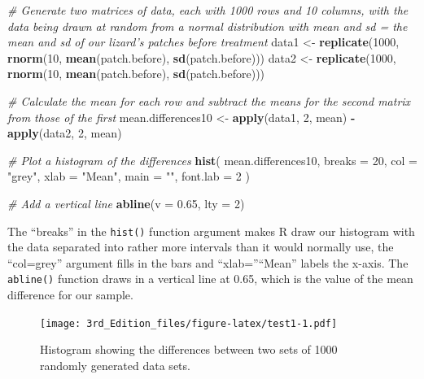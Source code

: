 \documentclass[
]{book}
\newenvironment{Shaded}{\begin{snugshade}}{\end{snugshade}}
\newcommand{\CommentTok}[1]{\textcolor[rgb]{0.56,0.35,0.01}{\textit{#1}}}
\newcommand{\DataTypeTok}[1]{\textcolor[rgb]{0.13,0.29,0.53}{#1}}
\newcommand{\DecValTok}[1]{\textcolor[rgb]{0.00,0.00,0.81}{#1}}
\newcommand{\FloatTok}[1]{\textcolor[rgb]{0.00,0.00,0.81}{#1}}
\newcommand{\KeywordTok}[1]{\textcolor[rgb]{0.13,0.29,0.53}{\textbf{#1}}}
\newcommand{\NormalTok}[1]{#1}
\newcommand{\OperatorTok}[1]{\textcolor[rgb]{0.81,0.36,0.00}{\textbf{#1}}}
\newcommand{\StringTok}[1]{\textcolor[rgb]{0.31,0.60,0.02}{#1}}
\begin{document}
\begin{Shaded}
\begin{Highlighting}[]

\CommentTok{# Generate two matrices of data, each with 1000 rows and 10 columns, with the data being drawn at random from a normal distribution with mean and sd = the mean and sd of our lizard's patches before treatment}
\NormalTok{data1 <-}\StringTok{ }\KeywordTok{replicate}\NormalTok{(}\DecValTok{1000}\NormalTok{, }\KeywordTok{rnorm}\NormalTok{(}\DecValTok{10}\NormalTok{, }\KeywordTok{mean}\NormalTok{(patch.before), }\KeywordTok{sd}\NormalTok{(patch.before)))}
\NormalTok{data2 <-}\StringTok{ }\KeywordTok{replicate}\NormalTok{(}\DecValTok{1000}\NormalTok{, }\KeywordTok{rnorm}\NormalTok{(}\DecValTok{10}\NormalTok{, }\KeywordTok{mean}\NormalTok{(patch.before), }\KeywordTok{sd}\NormalTok{(patch.before)))}

\CommentTok{# Calculate the mean for each row and subtract the means for the second matrix from those of the first}
\NormalTok{mean.differences10 <-}\StringTok{ }\KeywordTok{apply}\NormalTok{(data1, }\DecValTok{2}\NormalTok{, mean) }\OperatorTok{-}\StringTok{ }\KeywordTok{apply}\NormalTok{(data2, }\DecValTok{2}\NormalTok{, mean)}

\CommentTok{# Plot a histogram of the differences}
\KeywordTok{hist}\NormalTok{(}
\NormalTok{  mean.differences10,}
  \DataTypeTok{breaks =} \DecValTok{20}\NormalTok{,}
  \DataTypeTok{col =} \StringTok{"grey"}\NormalTok{,}
  \DataTypeTok{xlab =} \StringTok{"Mean"}\NormalTok{,}
  \DataTypeTok{main =} \StringTok{""}\NormalTok{,}
  \DataTypeTok{font.lab =} \DecValTok{2}
\NormalTok{)}

\CommentTok{# Add a vertical line}
\KeywordTok{abline}\NormalTok{(}\DataTypeTok{v =} \FloatTok{0.65}\NormalTok{, }\DataTypeTok{lty =} \DecValTok{2}\NormalTok{)}
\end{Highlighting}
\end{Shaded}

The ``breaks'' in the \texttt{hist()} function argument makes R draw our histogram with the data separated into rather more intervals than it would normally use, the ``col=grey'' argument fills in the bars and ``xlab=''``Mean'' labels the x-axis. The \texttt{abline()} function draws in a vertical line at 0.65, which is the value of the mean difference for our sample.

\begin{figure}
\centering
\texttt{[image: 3rd\_Edition\_files/figure-latex/test1-1.pdf]}
\caption{\label{fig:test1}Histogram showing the differences between two sets
of 1000 randomly generated data sets.}
\end{figure}
\end{document}
